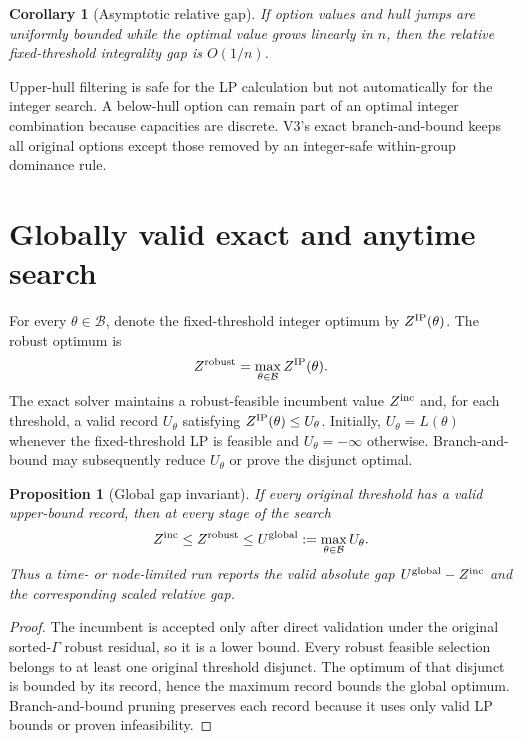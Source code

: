 \documentclass[11pt,a4paper]{article}
\newtheorem{proposition}[theorem]{Proposition}
\newtheorem{corollary}[theorem]{Corollary}
\theoremstyle{definition}
\theoremstyle{remark}
\newcommand{\B}{\mathcal B}
\begin{document}
\begin{corollary}[Asymptotic relative gap]
If option values and hull jumps are uniformly bounded while the optimal value
grows linearly in $n$, then the relative fixed-threshold integrality gap is
$O(1/n)$.
\end{corollary}

Upper-hull filtering is safe for the LP calculation but not automatically for
the integer search. A below-hull option can remain part of an optimal integer
combination because capacities are discrete. V3's exact branch-and-bound keeps
all original options except those removed by an integer-safe within-group
dominance rule.

\section{Globally valid exact and anytime search}

For every $\theta\in\B$, denote the fixed-threshold integer optimum by
$Z^{\rm IP}(\theta)$. The robust optimum is
\[
  Z^{\rm robust}=\max_{\theta\in\B}Z^{\rm IP}(\theta).
\]
The exact solver maintains a robust-feasible incumbent value
$Z^{\rm inc}$ and, for each threshold, a valid record $U_{\theta}$ satisfying
$Z^{\rm IP}(\theta)\le U_{\theta}$. Initially, $U_{\theta}=L(\theta)$ whenever
the fixed-threshold LP is feasible and $U_{\theta}=-\infty$ otherwise.
Branch-and-bound may subsequently reduce $U_{\theta}$ or prove the disjunct
optimal.

\begin{proposition}[Global gap invariant]
If every original threshold has a valid upper-bound record, then at every
stage of the search
\[
  Z^{\rm inc}\le Z^{\rm robust}\le
  U^{\rm global}:=\max_{\theta\in\B}U_{\theta}.
\]
Thus a time- or node-limited run reports the valid absolute gap
$U^{\rm global}-Z^{\rm inc}$ and the corresponding scaled relative gap.
\end{proposition}

\begin{proof}
The incumbent is accepted only after direct validation under the original
sorted-$\Gamma$ robust residual, so it is a lower bound. Every robust feasible
selection belongs to at least one original threshold disjunct. The optimum of
that disjunct is bounded by its record, hence the maximum record bounds the
global optimum. Branch-and-bound pruning preserves each record because it
uses only valid LP bounds or proven infeasibility.
\end{proof}
\end{document}
